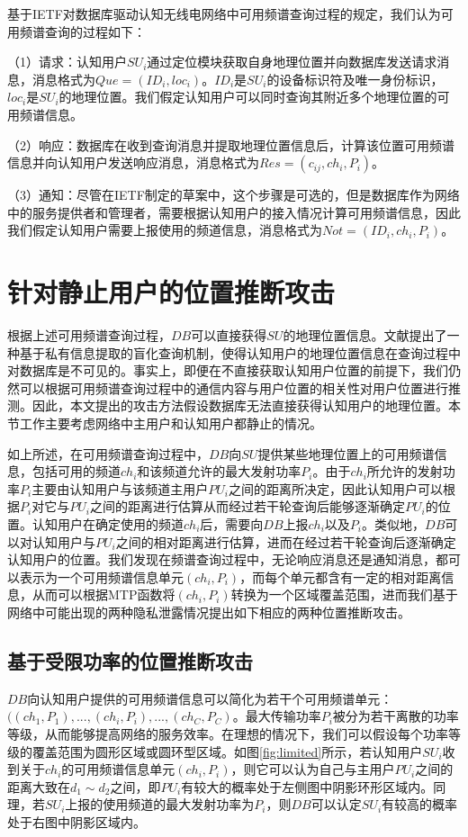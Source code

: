 基于IETF对数据库驱动认知无线电网络中可用频谱查询过程的规定，我们认为可用频谱查询的过程如下：

（1）请求：认知用户$SU_{i}$通过定位模块获取自身地理位置并向数据库发送请求消息，消息格式为$Que=(ID_{i},loc_{i})$。$ID_{i}$是$SU_{i}$的设备标识符及唯一身份标识，$loc_{i}$是$SU_{i}$的地理位置。我们假定认知用户可以同时查询其附近多个地理位置的可用频谱信息。

（2）响应：数据库在收到查询消息并提取地理位置信息后，计算该位置可用频谱信息并向认知用户发送响应消息，消息格式为$Res=(c_{ij},ch_{i},P_{i})$。

（3）通知：尽管在IETF制定的草案中，这个步骤是可选的，但是数据库作为网络中的服务提供者和管理者，需要根据认知用户的接入情况计算可用频谱信息，因此我们假定认知用户需要上报使用的频道信息，消息格式为$Not=(ID_{i},ch_{i},P_{i})$。


\section{针对静止用户的位置推断攻击}\label{sec:attack-fixed}

根据上述可用频谱查询过程，$DB$可以直接获得$SU$的地理位置信息。文献\cite{gao2013location}提出了一种基于私有信息提取的盲化查询机制，使得认知用户的地理位置信息在查询过程中对数据库是不可见的。事实上，即便在不直接获取认知用户位置的前提下，我们仍然可以根据可用频谱查询过程中的通信内容与用户位置的相关性对用户位置进行推测。因此，本文提出的攻击方法假设数据库无法直接获得认知用户的地理位置。本节工作主要考虑网络中主用户和认知用户都静止的情况。

如上所述，在可用频谱查询过程中，$DB$向$SU$提供某些地理位置上的可用频谱信息，包括可用的频道$ch_{i}$和该频道允许的最大发射功率$P_{i}$。由于$ch_{i}$所允许的发射功率$P_{i}$主要由认知用户与该频道主用户$PU_{i}$之间的距离所决定，因此认知用户可以根据$P_{i}$对它与$PU_{i}$之间的距离进行估算从而经过若干轮查询后能够逐渐确定$PU_{i}$的位置。认知用户在确定使用的频道$ch_{i}$后，需要向$DB$上报$ch_{i}$以及$P_{i}$。类似地，$DB$可以对认知用户与$PU_{i}$之间的相对距离进行估算，进而在经过若干轮查询后逐渐确定认知用户的位置。我们发现在频谱查询过程中，无论响应消息还是通知消息，都可以表示为一个可用频谱信息单元$(ch_{i},P_{i})$，而每个单元都含有一定的相对距离信息，从而可以根据MTP函数将$(ch_{i},P_{i})$转换为一个区域覆盖范围，进而我们基于网络中可能出现的两种隐私泄露情况提出如下相应的两种位置推断攻击。

\subsection{基于受限功率的位置推断攻击}
$DB$向认知用户提供的可用频谱信息可以简化为若干个可用频谱单元：$((ch_{1},P_{1}),...,(ch_{i},P_{i}),...,(ch_{C},P_{C})$。最大传输功率$P_{i}$被分为若干离散的功率等级，从而能够提高网络的服务效率。在理想的情况下，我们可以假设每个功率等级的覆盖范围为圆形区域或圆环型区域。如图\ref{fig:limited}所示，若认知用户$SU_{i}$收到关于$ch_{i}$的可用频谱信息单元$(ch_{i},P_{i})$，则它可以认为自己与主用户$PU_{i}$之间的距离大致在$d_{1} \sim d_{2}$之间，即$PU_{i}$有较大的概率处于左侧图中阴影环形区域内。同理，若$SU_{i}$上报的使用频道的最大发射功率为$P_{i}$，则$DB$可以认定$SU_{i}$有较高的概率处于右图中阴影区域内。

